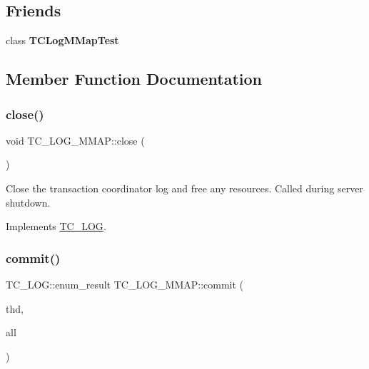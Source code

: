 \subsection*{Friends}
\begin{DoxyCompactItemize}
\item 
\mbox{\label{classTC__LOG__MMAP_ac8b1fd754b4e698a97f42b56221bb190}} 
class {\bfseries T\+C\+Log\+M\+Map\+Test}
\end{DoxyCompactItemize}


\subsection{Member Function Documentation}
\mbox{\label{classTC__LOG__MMAP_aefc50f2b1eeb68743a1ab72219f85db4}} 
\subsubsection{\texorpdfstring{close()}{close()}}
{\footnotesize\ttfamily void T\+C\+\_\+\+L\+O\+G\+\_\+\+M\+M\+A\+P\+::close (\begin{DoxyParamCaption}{ }\end{DoxyParamCaption})\hspace{0.3cm}{\ttfamily [virtual]}}

Close the transaction coordinator log and free any resources. Called during server shutdown. 

Implements \mbox{\hyperlink{classTC__LOG_a645b5d1b49c4c4396d327eef07e2dd53}{T\+C\+\_\+\+L\+OG}}.

\mbox{\label{classTC__LOG__MMAP_ac8696930a9546b39057462eca51b3648}} 
\subsubsection{\texorpdfstring{commit()}{commit()}}
{\footnotesize\ttfamily T\+C\+\_\+\+L\+O\+G\+::enum\+\_\+result T\+C\+\_\+\+L\+O\+G\+\_\+\+M\+M\+A\+P\+::commit (\begin{DoxyParamCaption}\item[{T\+HD $\ast$}]{thd,  }\item[{bool}]{all }\end{DoxyParamCaption})\hspace{0.3cm}{\ttfamily [virtual]}}

